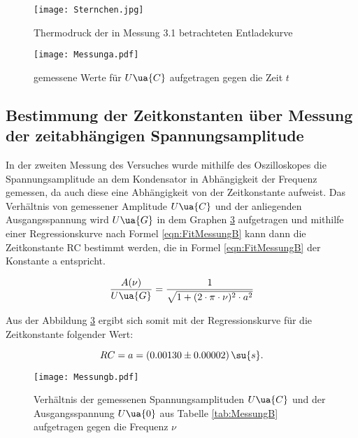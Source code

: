 \begin{figure}
  \centering
  \texttt{[image: Sternchen.jpg]}
  \caption{Thermodruck der in Messung 3.1 betrachteten Entladekurve }
  \label{fig:thermodruck}
\end{figure}

\begin{figure}
  \centering
  \texttt{[image: Messunga.pdf]}
  \caption{gemessene Werte für $U\ua{C}$ aufgetragen gegen die Zeit $t$}
  \label{fig:Messunga}
\end{figure}


\newpage

\subsection{Bestimmung der Zeitkonstanten über Messung der zeitabhängigen Spannungsamplitude}

In der zweiten Messung des Versuches wurde mithilfe des Oszilloskopes die
Spannungsamplitude an dem Kondensator in Abhängigkeit der Frequenz gemessen,
da auch diese eine Abhängigkeit von der Zeitkonstante aufweist.
Das Verhältnis von gemessener Amplitude $U\ua{C}$ und der anliegenden
Ausgangsspannung wird $U\ua{G}$ in dem Graphen \ref{fig:Messungb} aufgetragen und
mithilfe einer Regressionskurve nach Formel \eqref{eqn:FitMessungB} kann dann
die Zeitkonstante RC bestimmt werden, die in Formel \eqref{eqn:FitMessungB} der
Konstante a entspricht.

\begin{equation}
  \frac{A(\nu)}{U\ua{G}} = \frac{1}{ \sqrt{ 1 + ( 2 \cdot \pi \cdot \nu )^2 \cdot a^2}}
  \label{eqn:FitMessungB}
\end{equation}

Aus der Abbildung \ref{fig:Messungb} ergibt sich somit mit der Regressionskurve
für die Zeitkonstante folgender Wert:

\begin{equation}
  RC = a = (0.00130 \pm 0.00002) \, \su{s} .
\end{equation}

\begin{figure}
  \centering
  \texttt{[image: Messungb.pdf]}
  \caption{Verhältnis der gemessenen Spannungsamplituden $U\ua{C}$ und der
           Ausgangsspannung $U\ua{0}$ aus Tabelle \ref{tab:MessungB} aufgetragen
          gegen die Frequenz $\nu$}
  \label{fig:Messungb}
\end{figure}

